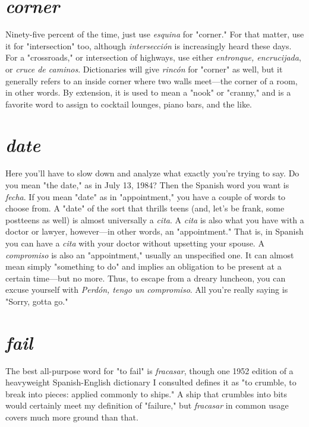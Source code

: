 \section{\emph{corner}}

Ninety-five percent of the time, just use \emph{esquina} for "corner."
For that matter, use it for "intersection" too, although \emph{intersección}
is increasingly heard these days. For a "crossroads," or intersection
of highways, use either \emph{entronque, encrucijada}, or \emph{cruce de caminos}.
Dictionaries will give \emph{rincón} for "corner" as well, but it generally refers to an inside corner where two walls meet---the corner of a room,
in other words. By extension, it is used to mean a "nook" or "cranny,"
and is a favorite word to assign to cocktail lounges, piano bars, and
the like.

\section{\emph{date}}

Here you'll have to slow down and analyze what exactly you're
trying to say. Do you mean "the date," as in July 13, 1984? Then the
Spanish word you want is \emph{fecha}. If you mean "date" as in "appointment," you have a couple of words to choose from. A "date" of the sort
that thrills teens (and, let's be frank, some postteens as well) is almost
universally a \emph{cita}. A \emph{cita} is also what you have with a doctor or lawyer, however---in other words, an "appointment." That is, in Spanish
you can have a \emph{cita} with your doctor without upsetting your spouse. A
\emph{compromiso} is also an "appointment," usually an unspecified one. It
can almost mean simply "something to do" and implies an obligation
to be present at a certain time---but no more. Thus, to escape from a
dreary luncheon, you can excuse yourself with \emph{Perdón, tengo un compromiso}. All you're really saying is "Sorry, gotta go."

\section{\emph{fail}}

The best all-purpose word for "to fail" is \emph{fracasar}, though one
1952 edition of a heavyweight Spanish-English dictionary I consulted
defines it as "to crumble, to break into pieces: applied commonly to
ships." A ship that crumbles into bits would certainly meet my definition of "failure," but \emph{fracasar} in common usage covers
much more
ground than that.


